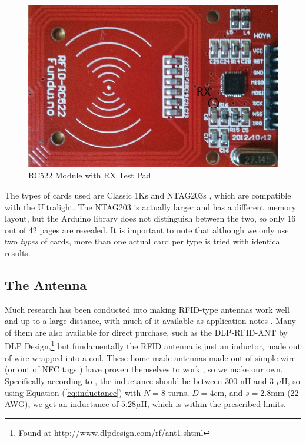 \documentclass[fleqn,10pt]{SelfArx} %
\begin{document}
\begin{figure}[tp]
  \includegraphics[width=\linewidth]{img/rc522}
  \caption{RC522 Module with RX Test Pad}
  \label{fig:rc522}
\end{figure}


The types of cards used are Classic 1Ks and NTAG203s \cite{ntag203}, which are compatible with the Ultralight. The NTAG203 is actually larger and has a different memory layout, but the Arduino library does not distinguish between the two, so only 16 out of 42 pages are revealed. It is important to note that although we only use two {\em types} of cards, more than one actual card per type is tried with identical results.

\subsection{The Antenna}
\label{subsec:antenna}

Much research has been conducted into making RFID-type antennas work well and up to a large distance, with much of it available as application notes \cite{mifare, antenna, pnantenna}. Many of them are also available for direct purchase, such as the DLP-RFID-ANT by DLP Design,\footnote{Found at \url{http://www.dlpdesign.com/rf/ant1.shtml}} but fundamentally the RFID antenna is just an inductor, made out of wire wrapped into a coil. These home-made antennas made out of simple wire (or out of NFC tags \cite{nfcantenna}) have proven themselves to work \cite{wireantenna}, so we make our own. Specifically according to \cite{pnantenna}, the inductance should be between 300 nH and 3 $\mu$H, so using Equation (\ref{eq:inductance}) with $N=8$ turns, $D=4$cm, and $s=2.8$mm (22 AWG), we get an inductance of $5.28 \mu$H, which is within the prescribed limits.
\end{document}
